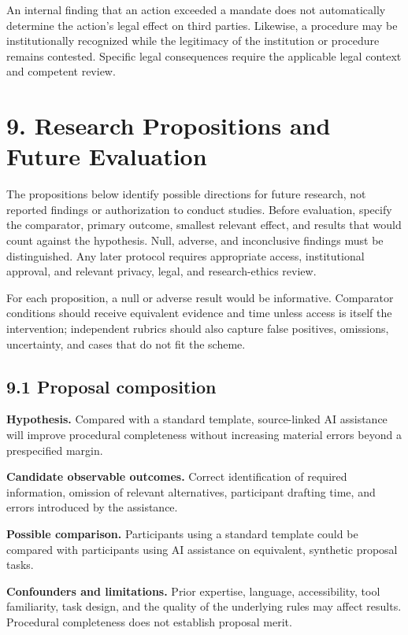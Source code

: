 \documentclass[
  10pt,
]{article}
\begin{document}
An internal finding that an action exceeded a mandate does not
automatically determine the action's legal effect on third parties.
Likewise, a procedure may be institutionally recognized while the
legitimacy of the institution or procedure remains contested. Specific
legal consequences require the applicable legal context and competent
review.

\section{9. Research Propositions and Future
Evaluation}\label{research-propositions-and-future-evaluation}

The propositions below identify possible directions for future research,
not reported findings or authorization to conduct studies. Before
evaluation, specify the comparator, primary outcome, smallest relevant
effect, and results that would count against the hypothesis. Null,
adverse, and inconclusive findings must be distinguished. Any later
protocol requires appropriate access, institutional approval, and
relevant privacy, legal, and research-ethics review.

For each proposition, a null or adverse result would be informative.
Comparator conditions should receive equivalent evidence and time unless
access is itself the intervention; independent rubrics should also
capture false positives, omissions, uncertainty, and cases that do not
fit the scheme.

\subsection{9.1 Proposal composition}\label{proposal-composition}

\textbf{Hypothesis.} Compared with a standard template, source-linked AI
assistance will improve procedural completeness without increasing
material errors beyond a prespecified margin.

\textbf{Candidate observable outcomes.} Correct identification of
required information, omission of relevant alternatives, participant
drafting time, and errors introduced by the assistance.

\textbf{Possible comparison.} Participants using a standard template
could be compared with participants using AI assistance on equivalent,
synthetic proposal tasks.

\textbf{Confounders and limitations.} Prior expertise, language,
accessibility, tool familiarity, task design, and the quality of the
underlying rules may affect results. Procedural completeness does not
establish proposal merit.
\end{document}
